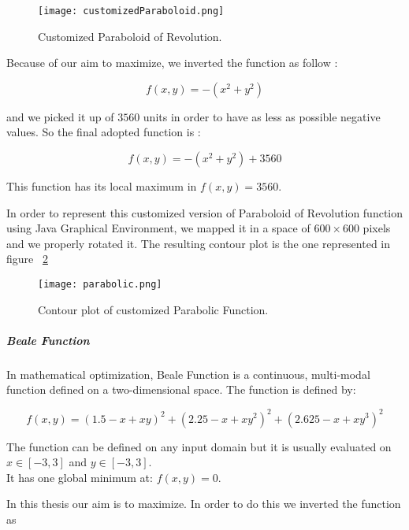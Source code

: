 \begin{figure}[h!]
	\centering
	\texttt{[image: customizedParaboloid.png]}
	\caption{Customized Paraboloid of Revolution.}
	\label{fig:CustomizedParaboloidOfRevolution}
\end{figure}

Because of our aim to maximize, we inverted the function as follow :

\begin{equation}
f(x, y) = -(x^2 + y^2)
\end{equation}

and we picked it up of $3560$ units in order to have as less as possible negative values. So the final adopted function is :

\begin{equation}
f(x, y) = -(x^2 + y^2) + 3560
\end{equation}

This function has its local maximum in $f(x, y) = 3560$.

In order to represent this customized version of Paraboloid of Revolution function using Java Graphical Environment, we mapped it in a space of $600 \times 600$ pixels and we properly rotated it. The resulting contour plot is the one represented in figure ~\ref{fig:ContourPlotCustomizedParabolicFunction} 

\begin{figure}[h!]
	\centering
	\texttt{[image: parabolic.png]}
	\caption{Contour plot of customized Parabolic Function.}
	\label{fig:ContourPlotCustomizedParabolicFunction}
\end{figure}

\subparagraph{Beale Function} In mathematical optimization, Beale Function is a continuous, multi-modal function defined on a two-dimensional space. The function is defined by: 

\begin{equation}
f(x, y) = (1.5 - x + xy)^2 + (2.25 - x + xy^2)^2 + (2.625 - x + xy^3)^2
\end{equation}

The function can be defined on any input domain but it is usually evaluated on $x \in [-3, 3]$ and $y \in [-3, 3]$. \\

It has one global minimum at: $f(x, y) = 0$. 

In this thesis our aim is to maximize. In order to do this we inverted the function as

